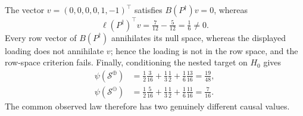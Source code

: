 The vector \(v=(0,0,0,0,1,-1)^\top\) satisfies
\(B(P^\dagger)v=0\), whereas
\[
 \ell(P^\dagger)^\top v=\tfrac7{12}-\tfrac5{12}=\tfrac16\ne0.
\]
Every row vector of \(B(P^\dagger)\) annihilates its null space, whereas the
displayed loading does not annihilate \(v\); hence the loading is not in the row
space, and the row-space criterion fails.
Finally, conditioning the nested target on \(H_0\) gives
\[
 \begin{aligned}
 \psi(\mathcal S^{\oplus})
 &=\tfrac12\tfrac3{16}+\tfrac13\tfrac12+
   \tfrac16\tfrac{13}{16}=\tfrac{19}{48},\\
 \psi(\mathcal S^{\ominus})
 &=\tfrac12\tfrac5{16}+\tfrac13\tfrac12+
   \tfrac16\tfrac{11}{16}=\tfrac7{16}.
 \end{aligned}
\]
The common observed law therefore has two genuinely different causal values.